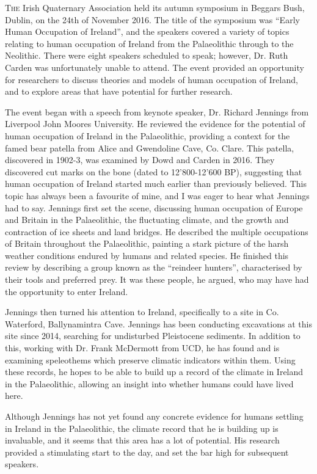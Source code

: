\documentclass[%
	]{ijsra}
\begin{document}
\IJSRAopening%
\lettrine{T}{he} 
Irish Quaternary Association held its autumn symposium in Beggars Bush, Dublin, on the 24th of November 2016. The title of the symposium was “Early Human Occupation of Ireland”, and the speakers covered a variety of topics relating to human occupation of Ireland from the Palaeolithic through to the Neolithic. There were eight speakers scheduled to speak; however, Dr. Ruth Carden was unfortunately unable to attend. The event provided an opportunity for researchers to discuss theories and models of human occupation of Ireland, and to explore areas that have potential for further research.

The event began with a speech from keynote speaker, Dr. Richard Jennings from Liverpool John Moores University. He reviewed the evidence for the potential of human occupation of Ireland in the Palaeolithic, providing a context for the famed bear patella from Alice and Gwendoline Cave, Co. Clare. This patella, discovered in 1902-3, was examined by Dowd and Carden in 2016. They discovered cut marks on the bone (dated to 12’800-12’600 BP), suggesting that human occupation of Ireland started much earlier than previously believed. This topic has always been a favourite of mine, and I was eager to hear what Jennings had to say.
Jennings first set the scene, discussing human occupation of Europe and Britain in the Palaeolithic, the fluctuating climate, and the growth and contraction of ice sheets and land bridges. He described the multiple occupations of Britain throughout the Palaeolithic, painting a stark picture of the harsh weather conditions endured by humans and related species. He finished this review by describing a group known as the “reindeer hunters”, characterised by their tools and preferred prey. It was these people, he argued, who may have had the opportunity to enter Ireland. 

Jennings then turned his attention to Ireland, specifically to a site in Co. Waterford, Ballynamintra Cave. Jennings has been conducting excavations at this site since 2014, searching for undisturbed Pleistocene sediments. In addition to this, working with Dr. Frank McDermott from UCD, he has found and is examining speleothems which preserve climatic indicators within them. Using these records, he hopes to be able to build up a record of the climate in Ireland in the Palaeolithic, allowing an insight into whether humans could have lived here. 

Although Jennings has not yet found any concrete evidence for humans settling in Ireland in the Palaeolithic, the climate record that he is building up is invaluable, and it seems that this area has a lot of potential. His research provided a stimulating start to the day, and set the bar high for subsequent speakers. 
\end{document}
